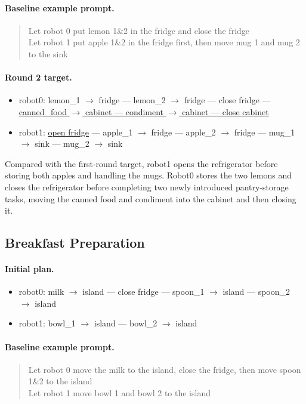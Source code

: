 \paragraph{Baseline example prompt.}
\begin{quote}\small\ttfamily
Let robot 0 put lemon 1\&2 in the fridge and close the fridge\\
Let robot 1 put apple 1\&2 in the fridge first, then move mug 1 and mug 2 to the sink
\end{quote}

\paragraph{Round 2 target.}
\begin{itemize}
    \item robot0: lemon\_1 $\rightarrow$ fridge --- lemon\_2 $\rightarrow$ fridge --- close fridge --- \underline{canned\_food $\rightarrow$ cabinet --- condiment $\rightarrow$ cabinet --- close cabinet}
    \item robot1: \underline{open fridge} --- apple\_1 $\rightarrow$ fridge --- apple\_2 $\rightarrow$ fridge --- mug\_1 $\rightarrow$ sink --- mug\_2 $\rightarrow$ sink
\end{itemize}
Compared with the first-round target, robot1 opens the refrigerator before storing both apples and handling the mugs.
Robot0 stores the two lemons and closes the refrigerator before completing two newly introduced pantry-storage tasks, moving the canned food and condiment into the cabinet and then closing it.

\subsection{Breakfast Preparation}

\paragraph{Initial plan.}
\begin{itemize}
    \item robot0: milk $\rightarrow$ island --- close fridge --- spoon\_1 $\rightarrow$ island --- spoon\_2 $\rightarrow$ island
    \item robot1: bowl\_1 $\rightarrow$ island --- bowl\_2 $\rightarrow$ island
\end{itemize}
\paragraph{Baseline example prompt.}
\begin{quote}\small\ttfamily
Let robot 0 move the milk to the island, close the fridge, then move spoon 1\&2 to the island\\
Let robot 1 move bowl 1 and bowl 2 to the island
\end{quote}


